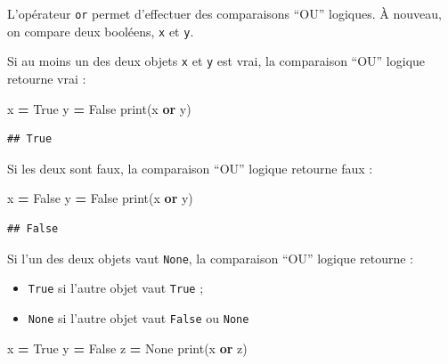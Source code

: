 \documentclass[12pt,]{book}
\newenvironment{Shaded}{\begin{snugshade}}{\end{snugshade}}
\newcommand{\KeywordTok}[1]{\textcolor[rgb]{0.13,0.29,0.53}{\textbf{#1}}}
\newcommand{\VariableTok}[1]{\textcolor[rgb]{0.00,0.00,0.00}{#1}}
\newcommand{\OperatorTok}[1]{\textcolor[rgb]{0.81,0.36,0.00}{\textbf{#1}}}
\newcommand{\BuiltInTok}[1]{#1}
\newcommand{\NormalTok}[1]{#1}
\providecommand{\tightlist}{%
  \setlength{\itemsep}{0pt}\setlength{\parskip}{0pt}}
\numberwithin{equation}{section}
\numberwithin{countremarque}{section}
\begin{document}
L'opérateur \texttt{or} permet d'effectuer des comparaisons ``OU''
logiques. À nouveau, on compare deux booléens, \texttt{x} et \texttt{y}.

Si au moins un des deux objets \texttt{x} et \texttt{y} est vrai, la
comparaison ``OU'' logique retourne vrai :

\begin{Shaded}
\begin{Highlighting}[]
\NormalTok{x }\OperatorTok{=} \VariableTok{True}
\NormalTok{y }\OperatorTok{=} \VariableTok{False}
\BuiltInTok{print}\NormalTok{(x }\KeywordTok{or}\NormalTok{ y)}
\end{Highlighting}
\end{Shaded}

\begin{lstlisting}
## True
\end{lstlisting}

Si les deux sont faux, la comparaison ``OU'' logique retourne faux :

\begin{Shaded}
\begin{Highlighting}[]
\NormalTok{x }\OperatorTok{=} \VariableTok{False}
\NormalTok{y }\OperatorTok{=} \VariableTok{False}
\BuiltInTok{print}\NormalTok{(x }\KeywordTok{or}\NormalTok{ y)}
\end{Highlighting}
\end{Shaded}

\begin{lstlisting}
## False
\end{lstlisting}

Si l'un des deux objets vaut \texttt{None}, la comparaison ``OU''
logique retourne :

\begin{itemize}
\tightlist
\item
  \texttt{True} si l'autre objet vaut \texttt{True} ;
\item
  \texttt{None} si l'autre objet vaut \texttt{False} ou \texttt{None}
\end{itemize}

\begin{Shaded}
\begin{Highlighting}[]
\NormalTok{x }\OperatorTok{=} \VariableTok{True}
\NormalTok{y }\OperatorTok{=} \VariableTok{False}
\NormalTok{z }\OperatorTok{=} \VariableTok{None}
\BuiltInTok{print}\NormalTok{(x }\KeywordTok{or}\NormalTok{ z)}
\end{Highlighting}
\end{Shaded}
\end{document}

